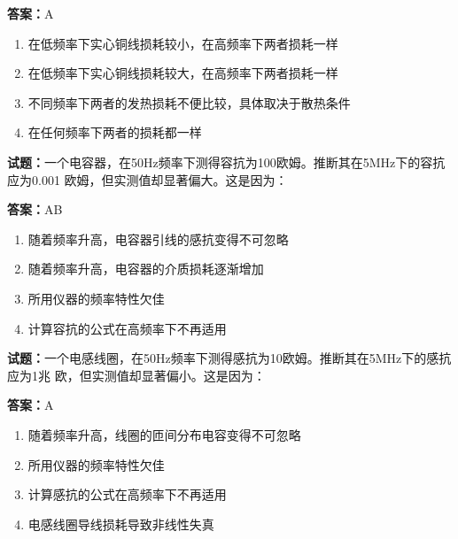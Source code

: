 \documentclass{ctexbook}
\begin{document}
\textbf{答案：}A 

\begin{enumerate}[leftmargin=3em]
  \item 在低频率下实心铜线损耗较小，在高频率下两者损耗一样 

  \item 在低频率下实心铜线损耗较大，在高频率下两者损耗一样 

  \item 不同频率下两者的发热损耗不便比较，具体取决于散热条件 

  \item 在任何频率下两者的损耗都一样 

\end{enumerate}





\vspace{1em}

\textbf{试题：}一个电容器，在50Hz频率下测得容抗为100欧姆。推断其在5MHz下的容抗应为0.001
欧姆，但实测值却显著偏大。这是因为： 

\textbf{答案：}AB 

\begin{enumerate}[leftmargin=3em]
  \item 随着频率升高，电容器引线的感抗变得不可忽略 

  \item 随着频率升高，电容器的介质损耗逐渐增加 

  \item 所用仪器的频率特性欠佳 

  \item 计算容抗的公式在高频率下不再适用 

\end{enumerate}





\vspace{1em}

\textbf{试题：}一个电感线圈，在50Hz频率下测得感抗为10欧姆。推断其在5MHz下的感抗应为1兆
欧，但实测值却显著偏小。这是因为： 

\textbf{答案：}A 

\begin{enumerate}[leftmargin=3em]
  \item 随着频率升高，线圈的匝间分布电容变得不可忽略 

  \item 所用仪器的频率特性欠佳 


  \item 计算感抗的公式在高频率下不再适用 

  \item 电感线圈导线损耗导致非线性失真 

\end{enumerate}
\end{document}
